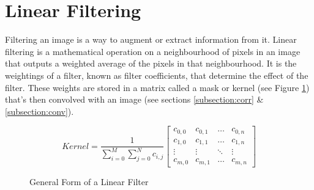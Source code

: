 \section{Linear Filtering}

Filtering an image is a way to augment or extract information from it. Linear filtering is a mathematical operation on a neighbourhood of pixels in an image that outputs a weighted average of the pixels in that neighbourhood. It is the weightings of a filter, known as filter coefficients, that determine the effect of the filter. These weights are stored in a matrix called a mask or kernel (see Figure \ref{fig:generalForm}) that's then convolved with an image (see sections \ref{subsection:corr} \& \ref{subsection:conv}).

\begin{figure}[h]
  
   \[ 
     Kernel  = \frac{1}{\sum\limits_{i=0}^{M}\sum\limits_{j=0}^{N}c_{i,j}}
    \begin{bmatrix}
      c_{0,0} & c_{0,1} & \dots & c_{0,n} \\
      c_{1,0} & c_{1,1} & \dots & c_{1,n} \\
      \vdots & \vdots & \ddots & \vdots \\
      c_{m,0} & c_{m,1} & \dots & c_{m,n}
    \end{bmatrix}
  \]
  \caption{General Form of a Linear Filter}
  \label{fig:generalForm}
\end{figure}










